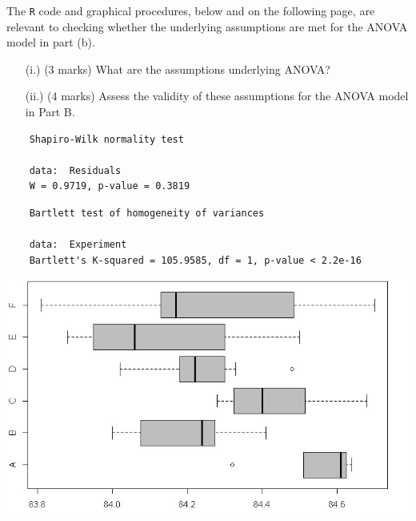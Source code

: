 \newpage



\item[(e)] The \texttt{R} code and graphical procedures, below and on the following page, are relevant to checking whether the underlying assumptions are met for the ANOVA model in part (b).
\begin{itemize}
	\item[(i.)] (3 marks) What are the assumptions underlying ANOVA?
	\item[(ii.)] (4 marks)  Assess the validity of these assumptions for the ANOVA model in Part B.
	
\end{itemize}
\begin{framed}
	\begin{verbatim}
	Shapiro-Wilk normality test
	
	data:  Residuals
	W = 0.9719, p-value = 0.3819
	\end{verbatim}
\end{framed}
\begin{framed}
	\begin{verbatim}
	Bartlett test of homogeneity of variances
	
	data:  Experiment
	Bartlett's K-squared = 105.9585, df = 1, p-value < 2.2e-16
	\end{verbatim}
\end{framed}
\begin{center}
	\includegraphics[scale=0.59]{images/ExamQ5boxplot}
\end{center}
\newpage
